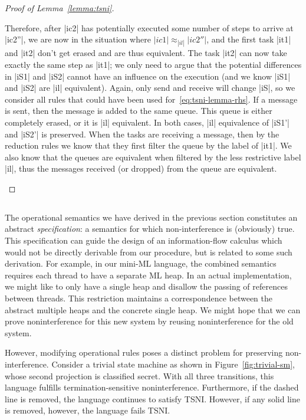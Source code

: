 \begin{proof}[Proof of Lemma~\ref{lemma:tsni}]
\begin{itemize}
    Therefore, after |ic2| has potentially executed some number of steps
    to arrive at |ic2''|, we are now in the situation where $|ic1|\approx_{|il|}|ic2''|$, and the first task |it1| and |it2| don't
    get erased and are thus equivalent.
    The task |it2| can now take exactly the same step as |it1|;  we only
    need to argue that the potential differences in |iS1| and |iS2| cannot
    have an influence on the execution (and we know |iS1| and |iS2| are
    |il| equivalent).
    Again, only send and receive will change |iS|, so we consider all
    rules that could have been used for~\eqref{eq:tsni-lemma-rhs}.  If
    a message is sent, then the message is added to the same queue.  This
    queue is either completely erased, or it is |il| equivalent.  In both
    cases, |il| equivalence of |iS1'| and |iS2'| is preserved.
    When the tasks are receiving a message, then by the reduction rules
    we know that they first filter the queue by the label of |it1|.  We
    also know that the queues are equivalent when filtered by the less
    restrictive label |il|, thus the messages received (or dropped) from the
    queue are equivalent.
  \end{itemize}
\end{proof}





\subsection{}

The operational semantics we have derived in the previous section
constitutes an abstract \emph{specification}: a semantics for which
non-interference is (obviously) true.  This specification can guide the
design of an information-flow calculus which would not be directly
derivable from our procedure, but is related to some such derivation.
For example, in our mini-ML language, the combined semantics requires
each thread to have a separate ML heap.  In an actual implementation, we
might like to only have a single heap and disallow the passing of
references between threads.  This restriction maintains a correspondence
between the abstract multiple heaps and the concrete single heap.  We might
hope that we can prove noninterference for this new system by reusing
noninterference for the old system.

However, modifying operational rules poses a distinct problem for
preserving non-interference.  Consider a trivial state machine as shown
in Figure~\ref{fig:trivial-sm}, whose second projection is classified
secret.  With all three transitions, this language fulfills
termination-sensitive noninterference.  Furthermore, if the dashed line
is removed, the language continues to satisfy TSNI.  However, if any
solid line is removed, however, the language fails TSNI.

